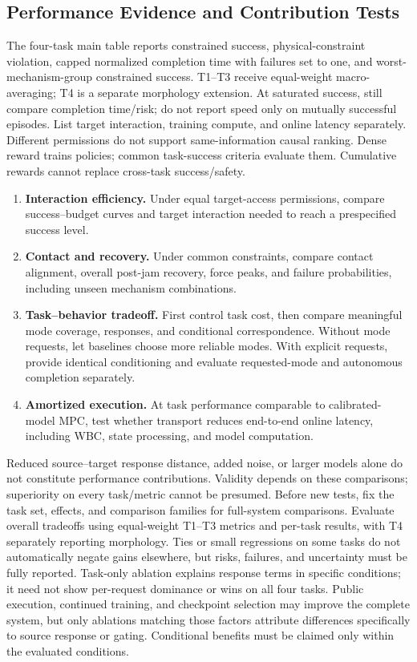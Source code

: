 \subsection{Performance Evidence and Contribution Tests}
The four-task main table reports constrained success, physical-constraint violation,
capped normalized completion time with failures set to one, and worst-mechanism-group
constrained success. T1--T3 receive equal-weight macro-averaging; T4 is a separate
morphology extension. At saturated success, still compare completion time/risk;
do not report speed only on mutually successful episodes. List target interaction,
training compute, and online latency separately. Different permissions do not support
same-information causal ranking. Dense reward trains policies; common task-success
criteria evaluate them. Cumulative rewards cannot replace cross-task success/safety.

\begin{enumerate}
\item \textbf{Interaction efficiency.} Under equal target-access permissions, compare
success--budget curves and target interaction needed to reach a prespecified success level.
\item \textbf{Contact and recovery.} Under common constraints, compare contact alignment,
overall post-jam recovery, force peaks, and failure probabilities, including unseen
mechanism combinations.
\item \textbf{Task--behavior tradeoff.} First control task cost, then compare meaningful
mode coverage, responses, and conditional correspondence. Without mode requests, let
baselines choose more reliable modes. With explicit requests, provide identical
conditioning and evaluate requested-mode and autonomous completion separately.
\item \textbf{Amortized execution.} At task performance comparable to calibrated-model
MPC, test whether transport reduces end-to-end online latency, including WBC,
state processing, and model computation.
\end{enumerate}
Reduced source--target response distance, added noise, or larger models alone do not
constitute performance contributions. Validity depends on these comparisons; superiority
on every task/metric cannot be presumed. Before new tests, fix the task set, effects,
and comparison families for full-system comparisons. Evaluate overall tradeoffs using
equal-weight T1--T3 metrics and per-task results, with T4 separately reporting morphology.
Ties or small regressions on some tasks do not automatically negate gains elsewhere,
but risks, failures, and uncertainty must be fully reported. Task-only ablation explains
response terms in specific conditions; it need not show per-request dominance or wins
on all four tasks. Public execution, continued training, and checkpoint selection may
improve the complete system, but only ablations matching those factors attribute
differences specifically to source response or gating. Conditional benefits must be
claimed only within the evaluated conditions.
